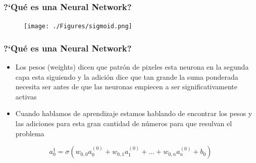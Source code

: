 \documentclass[10pt]{beamer}
\begin{document}
\begin{frame}
\frametitle{?`Qu\'e es una Neural Network?} 
  \begin{figure}
  \texttt{[image: ./Figures/sigmoid.png]}
  \end{figure}
\end{frame}



\begin{frame}
\frametitle{?`Qu\'e es una Neural Network?}
\begin{beamerboxesrounded}[upper=uppercolor, lower=lowercolor, shadow=true]{} 

\begin{itemize}
\item Los pesos (weights) dicen que patr\'on de pixeles esta neurona en la segunda capa esta siguiendo y la adici\'on dice que tan grande la suma ponderada necesita ser antes de que las neuronas empiecen a ser significativamente activas

\item Cuando hablamos de aprendizaje estamos hablando de encontrar los pesos y las adiciones para esta gran cantidad de n\'umeros para que resulvan el problema 
 \end{itemize}

\begin{equation*}
a_0^1 = \sigma(w_{0,0} a_0^{(0)} + w_{0,1} a_1^{(0)} +...+ w_{0,n} a_n^{(0)}+b_0)
\end{equation*}
 
\end{beamerboxesrounded}

\end{frame}
\end{document}
